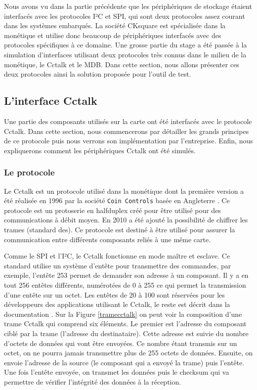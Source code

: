\documentclass[a4paper]{article}
\begin{document}
Nous avons vu dans la partie précédente que les périphériques de stockage
étaient interfacés avec les protocoles I²C et SPI, qui sont deux protocoles assez
courant dans les systèmes embarqués. La société CKsquare est spécialisée dans la
monétique et utilise donc beaucoup de périphériques interfacés avec des
protocoles spécifiques à ce domaine. Une grosse partie du stage a été passée à
la simulation d'interfaces utilisant deux protocoles très connus dans le milieu
de la monétique, le Cctalk et le MDB. Dans cette section, nous allons présenter
ces deux protocoles ainsi la solution proposée pour l'outil de test.

\subsection{L'interface Cctalk}%
\label{interfacecctalk}

Une partie des composants utilisés sur la carte ont été interfacés avec le
protocole Cctalk. Dans cette section, nous commencerons par détailler les grands
principes de ce protocole puis nous verrons son implémentation par l'entreprise.
Enfin, nous expliquerons comment les périphériques Cctalk ont été simulés.

\subsubsection{Le protocole}

Le Cctalk est un protocole utilisé dans la monétique dont la première version a
été réalisée en 1996 par la société \verb|Coin Controls| basée en Angleterre
\cite{cctalkpt1}. Ce protocole est un \gls{protoserie} en \gls{halfduplex} créé
pour être utilisé pour des communications à débit moyen. En 2010 a été ajouté la
possibilité de chiffrer les trames (standard \gls{des}). Ce protocole est
destiné à être utilisé pour assurer la communication entre différents composants
reliés à une même carte.

Comme le SPI et l'I²C, le Cctalk fonctionne en mode maître et esclave. Ce
standard utilise un système d'entête pour transmettre des commandes, par
exemple, l'entête 253 permet de demander son adresse à un composant. Il y a en
tout 256 entêtes différents, numérotées de 0 à 255 ce qui permet la
transmission d'une entête sur un octet. Les entêtes de 20 à 100 sont réservées
pour les développeurs des applications utilisant le Cctalk, le reste est décrit
dans la documentation \cite{cctalkpt2}. Sur la Figure \ref{tramecctalk} on peut
voir la composition d'une trame Cctalk qui comprend six éléments. Le premier est
l'adresse du composant ciblé par la trame (l'adresse du destinataire). Cette
adresse est suivie du nombre d'octets de données qui vont être envoyées. Ce
nombre étant transmis sur un octet, on ne pourra jamais transmettre plus de 255
octets de données. Ensuite, on envoie l'adresse de la source (le composant qui a
envoyé la trame) puis l'entête. Une fois l'entête envoyée, on transmet les
données puis le checksum qui va permettre de vérifier l'intégrité des données à
la réception.
\end{document}
